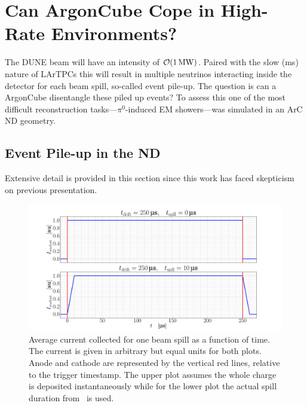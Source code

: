 \documentclass[a4paper]{article}
\begin{document}
		
\section{Can ArgonCube Cope in High-Rate Environments?}

The DUNE beam will have an intensity of $\order{\SI{1}{\mega\watt}}$.
Paired with the slow (\si{\milli\second}) nature of LArTPCs this will result in multiple neutrinos interacting inside the detector for each beam spill, so-called event pile-up.
The question is can a ArgonCube disentangle these piled up events?
To assess this one of the most difficult reconstruction tasks---$\pi^0$-induced EM showers---was simulated in an ArC ND geometry.

\subsection{Event Pile-up in the ND}

Extensive detail is provided in this section since this work has faced skepticism on previous presentation. 

\begin{figure}[tbp]
	\centering
	\includegraphics[width=\textwidth]{Figures/charge_flux}
	\caption[Average current collected for one beam spill as a function of time]{%
		Average current collected for one beam spill as a function of time.
		The current is given in arbitrary but equal units for both plots.
		Anode and cathode are represented by the vertical red lines, relative to the trigger timestamp.
		The upper plot assumes the whole charge is deposited instantaneously while for the lower plot the actual spill duration from~\cite{dune2} is used.
	}
	\label{fig:dune-nd_charge-flux}
\end{figure}
\end{document}
